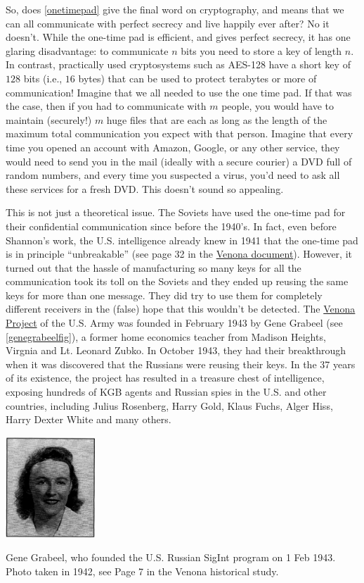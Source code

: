 So, does \cref{onetimepad} give the final word on cryptography, and
means that we can all communicate with perfect secrecy and live happily
ever after? No it doesn't. While the one-time pad is efficient, and
gives perfect secrecy, it has one glaring disadvantage: to communicate
\(n\) bits you need to store a key of length \(n\). In contrast,
practically used cryptosystems such as AES-128 have a short key of
\(128\) bits (i.e., \(16\) bytes) that can be used to protect terabytes
or more of communication! Imagine that we all needed to use the one time
pad. If that was the case, then if you had to communicate with \(m\)
people, you would have to maintain (securely!) \(m\) huge files that are
each as long as the length of the maximum total communication you expect
with that person. Imagine that every time you opened an account with
Amazon, Google, or any other service, they would need to send you in the
mail (ideally with a secure courier) a DVD full of random numbers, and
every time you suspected a virus, you'd need to ask all these services
for a fresh DVD. This doesn't sound so appealing.

This is not just a theoretical issue. The Soviets have used the one-time
pad for their confidential communication since before the 1940's. In
fact, even before Shannon's work, the U.S. intelligence already knew in
1941 that the one-time pad is in principle ``unbreakable'' (see page 32
in the \href{http://nsarchive.gwu.edu/NSAEBB/NSAEBB278/01.PDF}{Venona
document}). However, it turned out that the hassle of manufacturing so
many keys for all the communication took its toll on the Soviets and
they ended up reusing the same keys for more than one message. They did
try to use them for completely different receivers in the (false) hope
that this wouldn't be detected. The
\href{https://en.wikipedia.org/wiki/Venona_project}{Venona Project} of
the U.S. Army was founded in February 1943 by Gene Grabeel (see
\cref{genegrabeelfig}), a former home economics teacher from Madison
Heights, Virgnia and Lt. Leonard Zubko. In October 1943, they had their
breakthrough when it was discovered that the Russians were reusing their
keys. In the 37 years of its existence, the project has resulted in a
treasure chest of intelligence, exposing hundreds of KGB agents and
Russian spies in the U.S. and other countries, including Julius
Rosenberg, Harry Gold, Klaus Fuchs, Alger Hiss, Harry Dexter White and
many others.


\begin{marginfigure}
\centering
\includegraphics[width=\linewidth, height=1.5in, keepaspectratio]{../figure/genevenona.png}
\caption{Gene Grabeel, who founded the U.S. Russian SigInt program on 1
Feb 1943. Photo taken in 1942, see Page 7 in the Venona historical
study.}
\label{genegrabeelfig}
\end{marginfigure}


